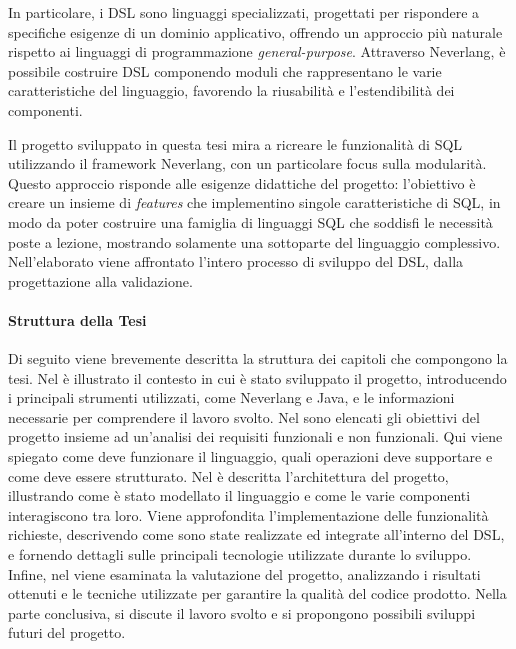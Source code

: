 \documentclass[12pt,a4paper,openright,twoside]{book}
\begin{document}
In particolare, i DSL sono linguaggi specializzati, progettati per rispondere a specifiche esigenze di un dominio applicativo, offrendo 
un approccio più naturale rispetto ai linguaggi di programmazione \textit{general-purpose}. Attraverso Neverlang, è possibile costruire 
DSL componendo moduli che rappresentano le varie caratteristiche del linguaggio, favorendo la riusabilità e l’estendibilità dei componenti.

Il progetto sviluppato in questa tesi mira a ricreare le funzionalità di SQL utilizzando il framework Neverlang, con un particolare 
focus sulla modularità. Questo approccio risponde alle esigenze didattiche del progetto: l’obiettivo è creare un insieme di 
\textit{features} che implementino singole caratteristiche di SQL, in modo da poter costruire una famiglia di linguaggi SQL che soddisfi 
le necessità poste a lezione, mostrando solamente una sottoparte del linguaggio complessivo. Nell’elaborato viene affrontato l’intero 
processo di sviluppo del DSL, dalla progettazione alla validazione.

\paragraph{Struttura della Tesi}
Di seguito viene brevemente descritta la struttura dei capitoli che compongono la tesi. Nel  è illustrato il 
contesto in cui è stato sviluppato il progetto, introducendo i principali strumenti utilizzati, come Neverlang e Java, e le informazioni 
necessarie per comprendere il lavoro svolto. Nel  sono elencati gli obiettivi del progetto insieme ad un’analisi 
dei requisiti funzionali e non funzionali. Qui viene spiegato come deve funzionare il linguaggio, quali operazioni deve supportare e 
come deve essere strutturato. Nel  è descritta l’architettura del progetto, illustrando come è stato modellato il 
linguaggio e come le varie componenti interagiscono tra loro. Viene approfondita l’implementazione delle funzionalità richieste, 
descrivendo come sono state realizzate ed integrate all’interno del DSL, e fornendo dettagli sulle principali tecnologie utilizzate 
durante lo sviluppo. Infine, nel  viene esaminata la valutazione del progetto, analizzando i risultati ottenuti 
e le tecniche utilizzate per garantire la qualità del codice prodotto. Nella parte conclusiva, si discute il lavoro svolto e si 
propongono possibili sviluppi futuri del progetto.

\end{document}
